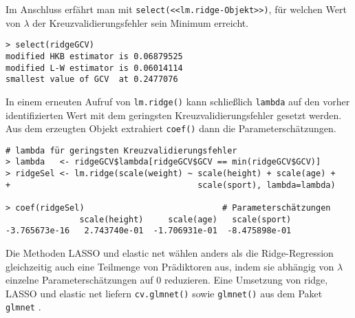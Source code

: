 Im Anschluss erfährt man mit \lstinline!select(<<lm.ridge-Objekt>>)!, für welchen Wert von $\lambda$ der Kreuzvalidierungsfehler sein Minimum erreicht.
\begin{lstlisting}
> select(ridgeGCV)
modified HKB estimator is 0.06879525
modified L-W estimator is 0.06014114
smallest value of GCV  at 0.2477076
\end{lstlisting}

In einem erneuten Aufruf von \lstinline!lm.ridge()! kann schließlich \lstinline!lambda! auf den vorher identifizierten Wert mit dem geringsten Kreuzvalidierungsfehler gesetzt werden. Aus dem erzeugten Objekt extrahiert \lstinline!coef()! dann die Parameterschätzungen.
\begin{lstlisting}
# lambda für geringsten Kreuzvalidierungsfehler
> lambda   <- ridgeGCV$lambda[ridgeGCV$GCV == min(ridgeGCV$GCV)]
> ridgeSel <- lm.ridge(scale(weight) ~ scale(height) + scale(age) +
+                                      scale(sport), lambda=lambda)

> coef(ridgeSel)                            # Parameterschätzungen
               scale(height)     scale(age)   scale(sport)
-3.765673e-16   2.743740e-01  -1.706931e-01  -8.475898e-01
\end{lstlisting}

Die Methoden LASSO und elastic net wählen anders als die Ridge-Regression gleichzeitig auch eine Teilmenge von Prädiktoren aus, indem sie abhängig von $\lambda$ einzelne Parameterschätzungen auf $0$ reduzieren. Eine Umsetzung von ridge, LASSO und elastic net liefern \lstinline!cv.glmnet()! sowie \lstinline!glmnet()! aus dem Paket \lstinline!glmnet! \cite{Friedman2010}.

